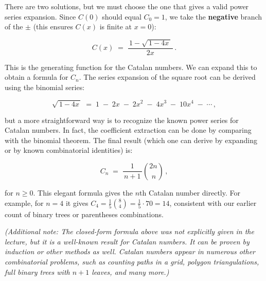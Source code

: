 \documentclass[docmute]{article}
\begin{document}
There are two solutions, but we must choose the one that gives a valid power series expansion. Since $C(0)$ should equal $C_0 = 1$, we take the \textbf{negative} branch of the $\pm$ (this ensures $C(x)$ is finite at $x=0$):

\[
C(x) \;=\; \frac{\,1 - \sqrt{\,1 - 4x\,}\,}{2x}\,.
\]

This is the generating function for the Catalan numbers. We can expand this to obtain a formula for $C_n$. The series expansion of the square root can be derived using the binomial series:

\[
\sqrt{\,1 - 4x\,} \;=\; 1 \;-\; 2x \;-\; 2x^2 \;-\; 4x^3 \;-\; 10x^4 \;-\; \cdots\,,
\] 

but a more straightforward way is to recognize the known power series for Catalan numbers. In fact, the coefficient extraction can be done by comparing with the binomial theorem. The final result (which one can derive by expanding or by known combinatorial identities) is:

\[
C_n \;=\; \frac{1}{\,n+1\,}\binom{2n}{\,n}\,,
\] 

for $n \ge 0$. This elegant formula gives the $n$th Catalan number directly. For example, for $n=4$ it gives $C_4 = \frac{1}{5}\binom{8}{4} = \frac{1}{5}\cdot 70 = 14$, consistent with our earlier count of binary trees or parentheses combinations.

\textit{(Additional note: The closed-form formula above was not explicitly given in the lecture, but it is a well-known result for Catalan numbers. It can be proven by induction or other methods as well. Catalan numbers appear in numerous other combinatorial problems, such as counting paths in a grid, polygon triangulations, full binary trees with $n+1$ leaves, and many more.)}
\end{document}
